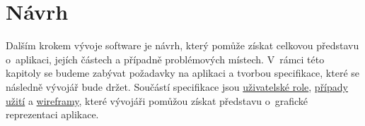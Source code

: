 \chapter{Návrh}
\label{ch:design}
Dalším krokem vývoje software je návrh, který pomůže získat celkovou představu o~aplikaci, jejích částech a případně problémových místech. V~rámci této kapitoly se budeme zabývat požadavky na aplikaci a tvorbou specifikace, které se následně vývojář bude držet. Součástí specifikace jsou \hyperref[sc:user_roles]{uživatelské role}, \hyperref[sc:use_cases]{případy užití} a \hyperref[sc:wireframes]{wireframy}, které vývojáři pomůžou získat představu o~grafické reprezentaci aplikace.











